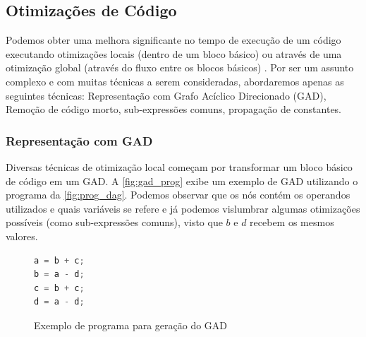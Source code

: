 \subsection{Otimizações de Código}
\label{sub:otimization}
Podemos obter uma melhora significante no tempo de execução de um código executando otimizações locais (dentro de um bloco básico) ou através de uma otimização global (através do fluxo entre os blocos básicos) \cite{Aho:1986}. Por ser um assunto complexo e com muitas técnicas a serem consideradas, abordaremos apenas as seguintes técnicas: Representação com Grafo Acíclico Direcionado (GAD), Remoção de código morto, sub-expressões comuns, propagação de constantes.

\subsubsection{Representação com GAD}
Diversas técnicas de otimização local começam por transformar um bloco básico de código em um GAD. A \autoref{fig:gad_prog} exibe um exemplo de GAD utilizando o programa da \autoref{fig:prog_dag}. Podemos observar que os nós contém os operandos utilizados e quais variáveis se refere e já podemos vislumbrar algumas otimizações possíveis (como sub-expressões comuns), visto que $b$ e $d$ recebem os mesmos valores. 

\begin{figure}[thp]
	\caption{\label{fig:prog_dag} Exemplo de programa para geração do GAD}
	\begin{center}
    \begin{minipage}{0.5\textwidth}
    \begin{lstlisting}[language=C]       
a = b + c;
b = a - d;
c = b + c;
d = a - d;
	\end{lstlisting}
    \end{minipage}
	\end{center}
\end{figure}

